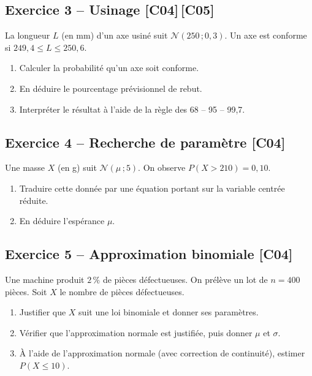 \documentclass[a4paper,11pt]{article}
\begin{document}
\subsection*{Exercice 3 -- Usinage \hfill {\normalsize\color{uimmred}[C04]\,[C05]}}
La longueur $L$ (en mm) d'un axe usiné suit $\mathcal{N}(250\,;0{,}3)$. Un axe est conforme si $249{,}4 \leq L \leq 250{,}6$.
\begin{enumerate}[label=\alph*)]
  \item Calculer la probabilité qu'un axe soit conforme.
  \item En déduire le pourcentage prévisionnel de rebut.
  \item Interpréter le résultat à l'aide de la règle des 68 -- 95 -- 99,7.
\end{enumerate}

\subsection*{Exercice 4 -- Recherche de paramètre \hfill {\normalsize\color{uimmred}[C04]}}
Une masse $X$ (en g) suit $\mathcal{N}(\mu\,;5)$. On observe $P(X > 210) = 0{,}10$.
\begin{enumerate}[label=\alph*)]
  \item Traduire cette donnée par une équation portant sur la variable centrée réduite.
  \item En déduire l'espérance $\mu$.
\end{enumerate}

\subsection*{Exercice 5 -- Approximation binomiale \hfill {\normalsize\color{uimmred}[C04]}}
Une machine produit $2\,\%$ de pièces défectueuses. On prélève un lot de $n = 400$ pièces. Soit $X$ le nombre de pièces défectueuses.
\begin{enumerate}[label=\alph*)]
  \item Justifier que $X$ suit une loi binomiale et donner ses paramètres.
  \item Vérifier que l'approximation normale est justifiée, puis donner $\mu$ et $\sigma$.
  \item À l'aide de l'approximation normale (avec correction de continuité), estimer $P(X \leq 10)$.
\end{enumerate}
\end{document}

